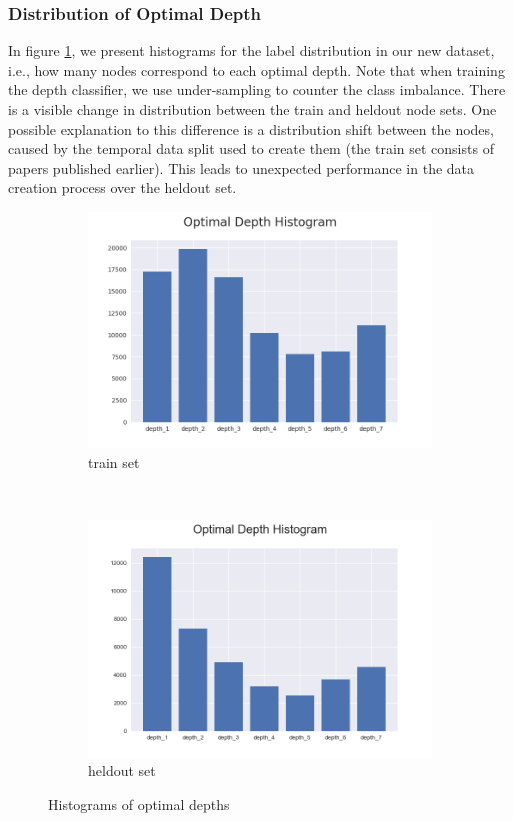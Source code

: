 \documentclass[11pt,a4paper]{article}
\begin{document}
	\subsubsection*{Distribution of Optimal Depth}
	In figure \ref{fig:histogram}, we present histograms for the label distribution in our new dataset, i.e., how many nodes correspond to each optimal depth. Note that when training the depth classifier, we use under-sampling to counter the class imbalance. There is a visible change in distribution between the train and heldout node sets. One possible explanation to this difference is a distribution shift between the nodes, caused by the temporal data split used to create them (the train set consists of papers published earlier). This leads to unexpected performance in the data creation process over the heldout set.

	\begin{figure}[t!]
		\centering
		\begin{subfigure}[t]{0.25\textwidth}
			\centering
			\includegraphics[width=1\linewidth]{images/optimal_depth_histogram_train.png}
			\caption{train set}
		\end{subfigure}%
		~ 
		\begin{subfigure}[t]{0.25\textwidth}
			\centering
			\includegraphics[width=1\linewidth]{images/optimal_depth_histogram.png}
			\caption{heldout set}
		\end{subfigure}
		\caption{Histograms of optimal depths}
		\label{fig:histogram}
	\end{figure}
\end{document}

